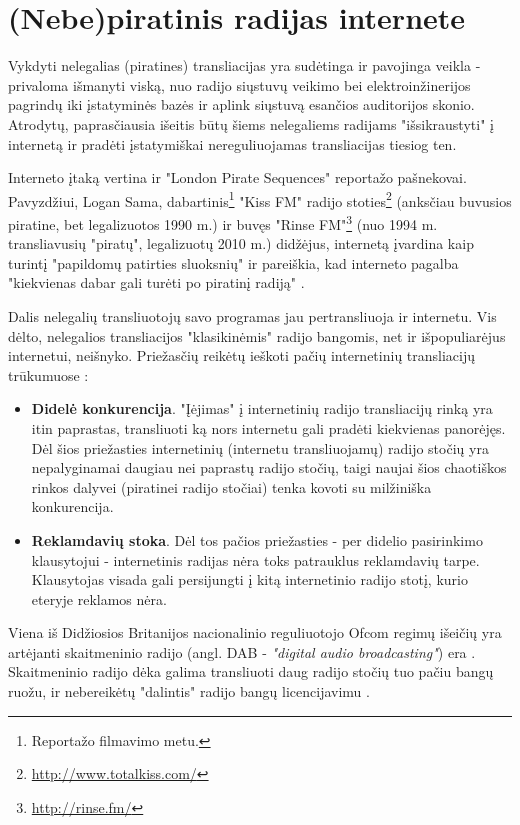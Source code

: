 \documentclass[kursinis-darbas]{vukf}
\begin{document}
\section{(Nebe)piratinis radijas internete}

Vykdyti nelegalias (piratines) transliacijas yra sudėtinga ir pavojinga veikla - privaloma išmanyti viską, nuo radijo siųstuvų veikimo bei elektroinžinerijos pagrindų iki įstatyminės bazės ir aplink siųstuvą esančios auditorijos skonio. Atrodytų, paprasčiausia išeitis būtų šiems nelegaliems radijams "išsikraustyti" į internetą ir pradėti įstatymiškai nereguliuojamas transliacijas tiesiog ten.

Interneto įtaką vertina ir "London Pirate Sequences" reportažo pašnekovai. Pavyzdžiui, Logan Sama, dabartinis\footnote{Reportažo filmavimo metu.} "Kiss FM" radijo stoties\footnote{\url{http://www.totalkiss.com/}} (anksčiau buvusios piratine, bet legalizuotos 1990 m.) ir buvęs "Rinse FM"\footnote{\url{http://rinse.fm/}} (nuo 1994 m. transliavusių "piratų", legalizuotų 2010 m.) didžėjus, internetą įvardina kaip turintį "papildomų patirties sluoksnių" ir pareiškia, kad interneto pagalba "kiekvienas dabar gali turėti po piratinį radiją" \cite{vice_london_pirate_sequences}.

Dalis nelegalių transliuotojų savo programas jau pertransliuoja ir internetu. Vis dėlto, nelegalios transliacijos "klasikinėmis" radijo bangomis, net ir išpopuliarėjus internetui, neišnyko. Priežasčių reikėtų ieškoti pačių internetinių transliacijų trūkumuose \cite[p.~758]{chs_encyclopedia_of_radio}:

\begin{itemize}
	\item \textbf{Didelė konkurencija}. "Įėjimas" į internetinių radijo transliacijų rinką yra itin paprastas, transliuoti ką nors internetu gali pradėti kiekvienas panorėjęs. Dėl šios priežasties internetinių (internetu transliuojamų) radijo stočių yra nepalyginamai daugiau nei paprastų radijo stočių, taigi naujai šios chaotiškos rinkos dalyvei (piratinei radijo stočiai) tenka kovoti su milžiniška konkurencija.
	\item \textbf{Reklamdavių stoka}. Dėl tos pačios priežasties - per didelio pasirinkimo klausytojui - internetinis radijas nėra toks patrauklus reklamdavių tarpe. Klausytojas visada gali persijungti į kitą internetinio radijo stotį, kurio eteryje reklamos nėra.
\end{itemize}

Viena iš Didžiosios Britanijos nacionalinio reguliuotojo \gls{Ofcom} regimų išeičių yra artėjanti skaitmeninio radijo (angl. DAB - \emph{"digital audio broadcasting"}) era \cite{bbc_radio_4_do_pirates_rule_the_air_waves}. Skaitmeninio radijo dėka galima transliuoti daug radijo stočių tuo pačiu bangų ruožu, ir nebereikėtų "dalintis" radijo bangų licencijavimu \cite{worlddab}.
\end{document}
